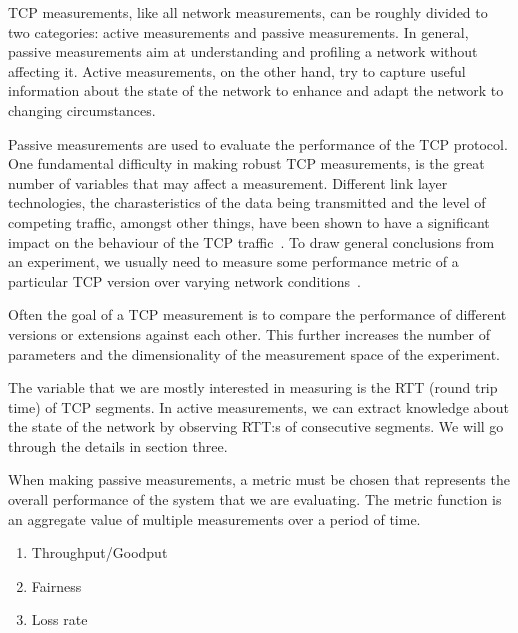 TCP measurements, like all network measurements, can be roughly divided to two categories: active measurements and passive measurements. In general, passive measurements aim at understanding and profiling a network without affecting it. Active measurements, on the other hand, try to capture useful information about the state of the network to enhance and adapt the network to changing circumstances.   

Passive measurements are used to evaluate the performance of the TCP protocol. One fundamental difficulty in making robust TCP measurements, is the great number of variables that may affect a measurement. Different link layer technologies, the charasteristics of the data being transmitted and the level of competing traffic, amongst other things, have been shown to have a significant impact on the behaviour of the TCP traffic~\cite{Allman99}. To draw general conclusions from an experiment, we usually need to measure some performance metric of a particular TCP version over varying network conditions~\cite{Allman99}.  

Often the goal of a TCP measurement is to compare the performance of different versions or extensions against each other. This further increases the number of parameters and the dimensionality of the measurement space of the experiment.

The variable that we are mostly interested in measuring is the RTT (round trip time) of TCP segments. In active measurements, we can extract knowledge about the state of the network by observing RTT:s of consecutive segments. We will go through the details in section three. 

When making passive measurements, a metric must be chosen that represents the overall performance of the system that we are evaluating. The metric function is an aggregate value of multiple measurements over a period of time.


\begin{enumerate}
	\item Throughput/Goodput
	\item Fairness
	\item Loss rate
\end{enumerate}